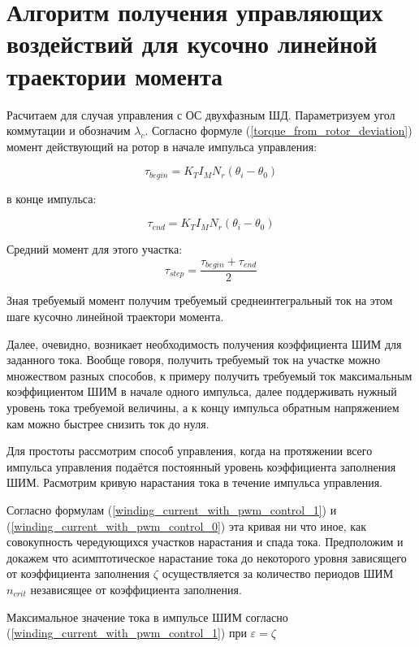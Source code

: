\newpage
\part{ Алгоритм получения управляющих воздействий для кусочно линейной траектории момента }

Расчитаем для случая управления с ОС двухфазным ШД. Параметризуем угол коммутации и обозначим
$\lambda_c$.
Согласно формуле (\ref{torque_from_rotor_deviation}) момент действующий на ротор в начале импульса
управления:

\begin{equation}
    \label{moment_to_rotor_at_the_begin_of_control_pulse}    
    \tau_{begin} = K_{T} I_{M} N_{r} (\theta_{i} - \theta_{0})
\end{equation}

в конце импульса:

\begin{equation}
    \label{moment_to_rotor_at_the_end_of_control_pulse}    
    \tau_{end} = K_{T} I_{M} N_{r} (\theta_{i} - \theta_{0})
\end{equation}

Средний момент для этого участка:
$$
    \tau_{step} = \frac{ \tau_{begin} + \tau_{end} }{ 2 }
$$

Зная требуемый момент получим требуемый среднеинтегральный ток на этом шаге кусочно линейной
траектори момента. 

Далее, очевидно, возникает необходимость получения коэффициента ШИМ для заданного тока. Вообще
говоря, получить требуемый ток на участке можно множеством разных способов, к примеру получить требуемый ток
максимальным коэффициентом ШИМ в начале одного импульса, далее поддерживать нужный уровень тока
требуемой величины, а к концу импульса обратным напряжением кам можно быстрее снизить ток до нуля.

Для простоты рассмотрим способ управления, когда на протяжении всего импульса управления подаётся постоянный
уровень коэффициента заполнения ШИМ. Расмотрим кривую нарастания тока в течение импульса управления.

Согласно формулам (\ref{winding_current_with_pwm_control_1}) 
и (\ref{winding_current_with_pwm_control_0}) эта кривая ни что иное, как совокупность чередующихся
участков нарастания и спада тока. Предположим и докажем что асимптотическое нарастание тока до
некоторого уровня зависящего от коэффициента заполнения $\zeta$ осуществляется за количество периодов ШИМ
$n_{crit}$ независящее от коэффициента заполнения. 

Максимальное значение тока в импульсе ШИМ согласно (\ref{winding_current_with_pwm_control_1}) при
$\varepsilon=\zeta$


